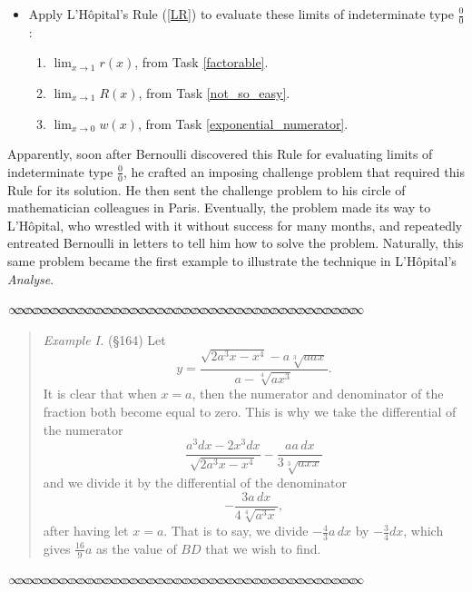 \message{ !name(LHopitalsRule_2021.03.29.tex)}\documentclass[11pt]{article}
\newcommand{\sep}{\vspace{-3pt}
\begin{center}
{\mathversion{normal}
$\infty \mspace{-5.5mu}\infty \mspace{-5.5mu}\infty \mspace{-5.5mu}\infty \mspace{-5.5mu}
\infty \mspace{-5.5mu}\infty \mspace{-5.5mu}\infty \mspace{-5.5mu}\infty \mspace{-5.5mu}
\infty \mspace{-5.5mu}\infty \mspace{-5.5mu}\infty \mspace{-5.5mu}\infty \mspace{-5.5mu}
\infty \mspace{-5.5mu}\infty \mspace{-5.5mu}\infty \mspace{-5.5mu}\infty \mspace{-5.5mu}
\infty \mspace{-5.5mu}\infty \mspace{-5.5mu}\infty \mspace{-5.5mu}\infty \mspace{-5.5mu}
\infty \mspace{-5.5mu}\infty \mspace{-5.5mu}\infty \mspace{-5.5mu}\infty \mspace{-5.5mu}
\infty \mspace{-5.5mu}\infty \mspace{-5.5mu}\infty \mspace{-5.5mu}\infty \mspace{-5.5mu}
\infty \mspace{-5.5mu}\infty \mspace{-5.5mu}\infty \mspace{-5.5mu}\infty \mspace{-5.5mu}
\infty \mspace{-5.5mu}\infty \mspace{-5.5mu}\infty \mspace{-5.5mu}\infty \mspace{-5.5mu}
\infty \mspace{-5.5mu}\infty \mspace{-5.5mu}\infty \mspace{-5.5mu}\infty \mspace{-5.5mu}$}
\end{center} \vspace*{-5pt}}
\newenvironment{source}%
 {\bigskip \sep \vspace*{-6pt} \begin{quote}
          \begin{sf}   }
   {   \end{sf}     \end{quote} \vspace*{-6pt} \sep \bigskip}%
\newcounter{tasknumb}
\newcommand{\tasknumb}[1]{\refstepcounter{tasknumb}\textmd{\textbf{$\fbox{$\fbox{Task \thetasknumb}$}$}}#1}
\newenvironment{task}[1][]%
 {\begin{itemize}
 \item[\tasknumb{#1}] }
{
    \end{itemize}    }%
\begin{document}
\begin{task}[\label{examples}]
Apply L'H\^opital's Rule (\ref{LR}) to evaluate these limits of indeterminate type ${\displaystyle \frac00}$:
\begin{enumerate}
\item[(a)] ${\displaystyle \lim_{x\to 1} r(x)}$, from Task \ref{factorable}. \\
\item[(b)] ${\displaystyle \lim_{x\to 1} R(x)}$, from Task \ref{not_so_easy}. \\
\item[(b)] ${\displaystyle \lim_{x\to 0} w(x)}$, from Task \ref{exponential_numerator}. \\
\end{enumerate}

\smallskip
\end{task}

Apparently, soon after Bernoulli discovered this Rule for evaluating limits of indeterminate type $\frac00$, he crafted an imposing challenge problem that required this Rule for its solution. He then sent the challenge problem to his circle of mathematician colleagues in Paris. Eventually, the problem made its way to L'H\^opital, who wrestled with it without success for many months, and repeatedly entreated Bernoulli in letters to tell him how to solve the problem. Naturally, this same problem became the first example to illustrate the technique in L'H\^opital's \emph{Analyse}.
\begin{source}
\emph{Example I.} (\S 164) Let $$y=\frac{\sqrt{2a^3x-x^4}-a\sqrt[3]{aax}}{a-\sqrt[4]{ax^3}}.$$It is clear that when $x=a$, then the numerator and denominator of the fraction both become equal to zero. This is why we take the differential of the numerator $$\frac{a^3dx-2x^3dx}{\sqrt{2a^3x-x^4}}-\frac{aa\,dx}{3\sqrt[3]{axx}}$$and we divide it by the differential of the denominator$$-\frac{3a\,dx}{4\sqrt[4]{a^3x}},$$after having let $x=a$. That is to say, we divide $-\frac43 a\,dx$ by $-\frac34 dx$, which gives $\frac{16}{9}a$ as the value of $BD$ that we wish to find.
\end{source}
\end{document}

